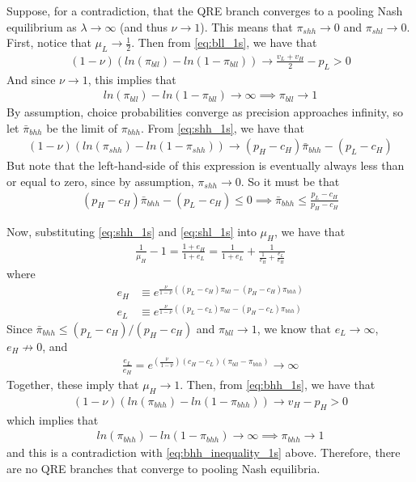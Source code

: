 \documentclass[12pt]{article}
\begin{document}
Suppose, for a contradiction, that the QRE branch converges to a pooling Nash equilibrium as $\lambda \to \infty$ (and thus $\nu \to 1$). This means that $\pi_{shh} \to 0$ and $\pi_{shl} \to 0$. First, notice that $\mu_L \to \frac{1}{2}$. Then from \ref{eq:bll_1s}, we have that
\begin{align*}
(1 - \nu) \left( ln \left( \pi_{bll} \right) - ln \left( 1 - \pi_{bll} \right) \right) \to \frac{v_L + v_H}{2} - p_L > 0
\end{align*}
And since $\nu \to 1$, this implies that 
\begin{align*}
ln \left( \pi_{bll} \right) - ln \left( 1 - \pi_{bll} \right) \to \infty \implies \pi_{bll} \to 1
\end{align*}
By assumption, choice probabilities converge as precision approaches infinity, so let $\bar{\pi}_{bhh}$ be the limit of $\pi_{bhh}$. From \ref{eq:shh_1s}, we have that
\begin{align*}
(1 - \nu) \left( ln \left( \pi_{shh} \right) - ln \left( 1 - \pi_{shh} \right) \right) \to (p_H - c_H) \bar{\pi}_{bhh} - (p_L - c_H)
\end{align*}
But note that the left-hand-side of this expression is eventually always less than or equal to zero, since by assumption, $\pi_{shh} \to 0$. So it must be that
\begin{align}
(p_H - c_H) \bar{\pi}_{bhh} - (p_L - c_H) \leq 0 \implies \bar{\pi}_{bhh} \leq \frac{p_L - c_H}{p_H - c_H} \label{eq:bhh_inequality_1s}
\end{align}

Now, substituting \ref{eq:shh_1s} and \ref{eq:shl_1s} into $\mu_H$, we have that
\begin{align*}
\frac{1}{\mu_H} - 1 = \frac{1 + e_H}{1 + e_L} = \frac{1}{1 + e_L} + \frac{1}{\frac{1}{e_H} + \frac{e_L}{e_H}}
\end{align*}
where
\begin{align*}
e_H &\equiv e^{\frac{\nu}{1 - \nu} \left( (p_L - c_H) \pi_{bll} - (p_H - c_H) \pi_{bhh} \right)} \\
e_L &\equiv e^{\frac{\nu}{1 - \nu} \left( (p_L - c_L) \pi_{bll} - (p_H - c_L) \pi_{bhh} \right)}
\end{align*}
Since $\bar{\pi}_{bhh} \leq (p_L - c_H)/(p_H - c_H)$ and $\pi_{bll} \to 1$, we know that $e_L \to \infty$, $e_H \not\to 0$, and 
\begin{align*}
\frac{e_L}{e_H} = e^{\left( \frac{\nu}{1 - \nu} \right) (c_H - c_L) (\pi_{bll} - \pi_{bhh})} \to \infty
\end{align*}
Together, these imply that $\mu_H \to 1$. Then, from \ref{eq:bhh_1s}, we have that
\begin{align*}
(1 - \nu) \left( ln \left( \pi_{bhh} \right) - ln \left( 1 - \pi_{bhh} \right) \right) \to v_H - p_H > 0
\end{align*}
which implies that
\begin{align*}
ln \left( \pi_{bhh} \right) - ln \left( 1 - \pi_{bhh} \right) \to \infty \implies \pi_{bhh} \to 1
\end{align*}
and this is a contradiction with \ref{eq:bhh_inequality_1s} above. Therefore, there are no QRE branches that converge to pooling Nash equilibria.
\end{document}
